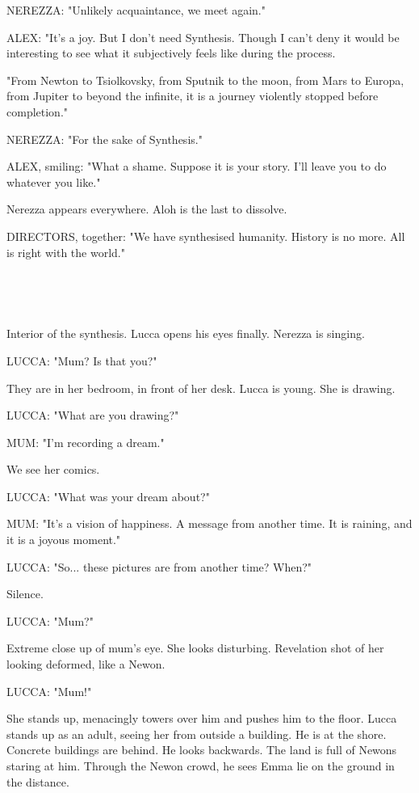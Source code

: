 \documentclass[11pt]{article}
\begin{document}
NEREZZA: "Unlikely acquaintance, we meet again."

ALEX: "It's a joy. 
But I don't need Synthesis.
Though I can't deny it would be interesting to see what it subjectively feels like during the process.

"From Newton to Tsiolkovsky, from Sputnik to the moon, from Mars to Europa, from Jupiter to beyond the infinite, it is a journey violently stopped before completion."

NEREZZA: "For the sake of Synthesis."

ALEX, smiling: "What a shame.
Suppose it is your story.
I'll leave you to do whatever you like."

Nerezza appears everywhere.
Aloh is the last to dissolve.

DIRECTORS, together: "We have synthesised humanity.
History is no more.
All is right with the world."

\ 

\ 

Interior of the synthesis. 
Lucca opens his eyes finally. 
Nerezza is singing.

LUCCA: "Mum? Is that you?"

They are in her bedroom, in front of her desk.
Lucca is young.
She is drawing. 

LUCCA: "What are you drawing?"

MUM: "I'm recording a dream."

We see her comics.

LUCCA: "What was your dream about?"

MUM: "It's a vision of happiness. 
A message from another time.
It is raining, and it is a joyous moment."

LUCCA: "So... these pictures are from another time?
When?"

Silence.

LUCCA: "Mum?"

Extreme close up of mum's eye.
She looks disturbing.
Revelation shot of her looking deformed, like a Newon.

LUCCA: "Mum!"

She stands up, menacingly towers over him and pushes him to the floor.
Lucca stands up as an adult, seeing her from outside a building.
He is at the shore. 
Concrete buildings are behind.
He looks backwards.
The land is full of Newons staring at him.
Through the Newon crowd, he sees Emma lie on the ground in the distance. 

\ 

\ 
\end{document}
